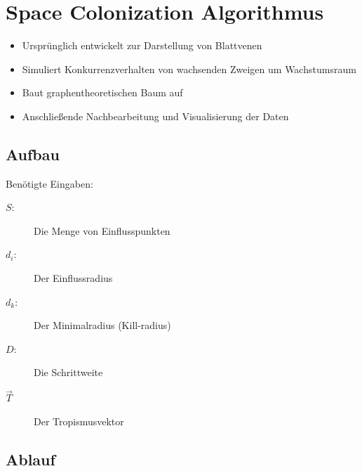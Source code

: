 \newpage
\slidetitle{}
\section{Space Colonization Algorithmus\\}

\begin{itemize}
	\item Ursprünglich entwickelt zur Darstellung von Blattvenen \\
	
	\item Simuliert Konkurrenzverhalten von wachsenden Zweigen um Wachstumsraum\\
	
	\item Baut graphentheoretischen Baum auf \\
	
	\item Anschließende Nachbearbeitung und Visualisierung der Daten
\end{itemize}




\newpage
{}
\subsection{Aufbau}
Benötigte Eingaben:
\begin{description}
\item[\boldmath$S:$] Die Menge von Einflusspunkten\\

\item[\boldmath$d_i:$] Der Einflussradius\\

\item[\boldmath$d_k:$] Der Minimalradius (Kill-radius)\\

\item[\boldmath$D:$] Die Schrittweite\\

\item[\boldmath$\overrightarrow{T}$] Der Tropismusvektor
\end{description}




\newpage
{}
\subsection{Ablauf}

